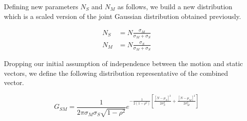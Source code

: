 \documentclass{article}
\begin{document}
Defining new parameters $N_S$ and $N_M$ as follows, we build a new distribution which is a scaled version of the joint Gaussian distribution obtained previously.

\begin{align*}
N_S &= N \frac{\sigma_M}{\sigma_M+\sigma_S}  \\
N_M &= N \frac{\sigma_S}{\sigma_M+\sigma_S}
\end{align*}

Dropping our initial assumption of independence between the motion and static vectors, we define the following distribution representative of the combined vector.

\begin{equation}
G_{SM}= \frac{1}{2\pi\sigma_M\sigma_S\sqrt{1-\rho^2}} e^{-\frac{1}{2(1-\rho^2)}\left[\frac{[N-\mu_S]^2}{2\sigma_S^2}+ \frac{[N-\mu_M]^2}{2\sigma_M^2} \right]}
\end{equation}
\end{document}
